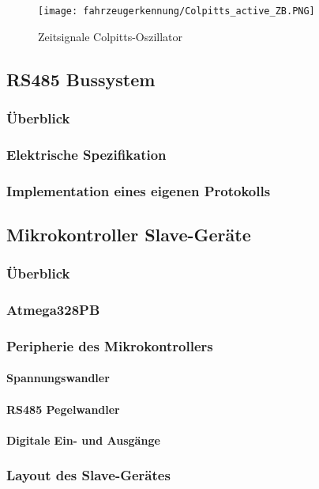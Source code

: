 \begin{figure}[H]
    \centering
    \texttt{[image: fahrzeugerkennung/Colpitts\_active\_ZB.PNG]}
    \caption{Zeitsignale Colpitts-Oszillator}
\end{figure}


\subsection{RS485 Bussystem}
\subsubsection{Überblick}
\subsubsection{Elektrische Spezifikation}
\subsubsection{Implementation eines eigenen Protokolls}

\subsection{Mikrokontroller Slave-Geräte}
\subsubsection{Überblick}
\subsubsection{Atmega328PB}
\subsubsection{Peripherie des Mikrokontrollers}
\paragraph{Spannungswandler}
\paragraph{RS485 Pegelwandler}
\paragraph{Digitale Ein- und Ausgänge}
\subsubsection{Layout des Slave-Gerätes}
